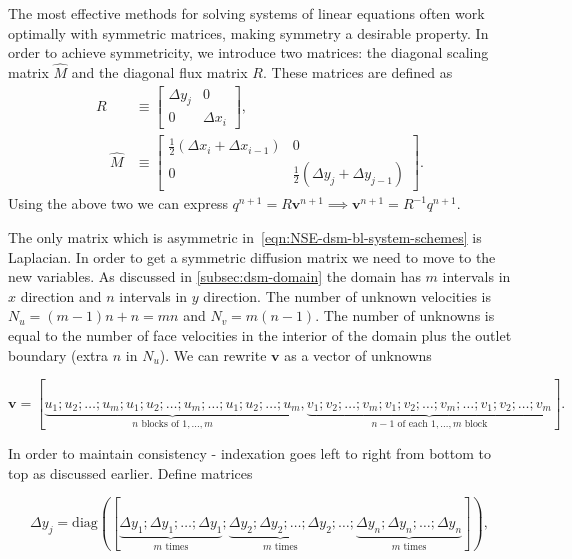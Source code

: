 \documentclass{article}
\begin{document}
The most effective methods for solving systems of linear equations often work optimally with symmetric matrices, making symmetry a desirable property. In order to achieve symmetricity, we introduce two matrices: the diagonal scaling matrix $\hat{M}$ and the diagonal flux matrix $R$. These matrices are defined as
\begin{align*}
R &\equiv\left[\begin{array}{cc}
\Delta y_j & 0 \\
0 & \Delta x_i
\end{array}\right], \\
\quad \hat{M} & \equiv\left[\begin{array}{cc}
\frac{1}{2}\left(\Delta x_i+\Delta x_{i-1}\right) & 0 \\
0 & \frac{1}{2}\left(\Delta y_j+\Delta y_{j-1}\right)
\end{array}\right].
\end{align*}
Using the above two we can express $q^{n+1}=R\boldsymbol{v}^{n+1}\implies \boldsymbol{v}^{n+1}=R^{-1}q^{n+1}$. %

The only matrix which is asymmetric in~\eqref{eqn:NSE-dsm-bl-system-schemes} is Laplacian. In order to get a symmetric diffusion matrix we need to move to the new variables. As discussed in \ref{subsec:dsm-domain} the domain has $m$ intervals in $x$ direction and $n$ intervals in $y$ direction. The number of unknown velocities is $N_u=(m-1)n+n=mn$ and $N_v=m(n-1)$. The number of unknowns is equal to the number of face velocities in the interior of the domain plus the outlet boundary (extra $n$ in $N_u$). We can rewrite $\boldsymbol{v}$ as a vector of unknowns

$$\boldsymbol{v} = [\underbrace{u_1;u_2;\dotsc;u_{m};u_1;u_2;\dotsc;u_{m};\dotsc;u_1;u_2;\dotsc;u_{m}}_{n\text{ blocks of }1,...,m}, \underbrace{v_1;v_2;\dotsc;v_{m};v_1;v_2;\dotsc;v_{m};\dotsc;v_1;v_2;\dotsc;v_{m}}_{n-1 \text{ of each }1,\dotsc,m\text{ block}}].$$

In order to maintain consistency - indexation goes left to right from bottom to top as discussed earlier. Define matrices 

$$\Delta y_j=\text{diag}([\underbrace{\Delta y_1; \Delta y_1; \dotsc;\Delta y_1}_{m\text{ times}}; \underbrace{\Delta y_2; \Delta y_2; \dotsc;\Delta y_2}_{m\text{ times}};\dotsc;\underbrace{\Delta y_n; \Delta y_n; \dotsc;\Delta y_n}_{m\text{ times}}]),$$
\end{document}
